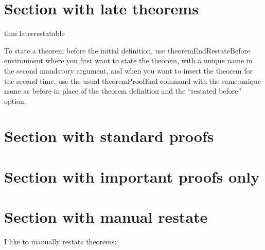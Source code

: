 \documentclass{article}
\begin{document}
\section{Section with late theorems}\label{sec:restateafter}
\begin{theoremEnd}{thm}
  laterrestatable
\end{theoremEnd}
\begin{proofEnd}
  To state a theorem before the initial definition, use theoremEndRestateBefore environment where you first want to state the theorem, with a unique name in the second mandatory argument, and when you want to insert the theorem for the second time, use the usual theoremProofEnd command with the same unique name as before in place of the theorem definition and the ``restated before'' option.  
\end{proofEnd}

\section{Section with standard proofs}
% 
\printProofs

\section{Section with important proofs only}
\printProofs[greattheorem]

\section{Section with manual restate}\label{sec:manualrestate}

I like to manually restate theorems:
\mymanualrestate*
\end{document}
